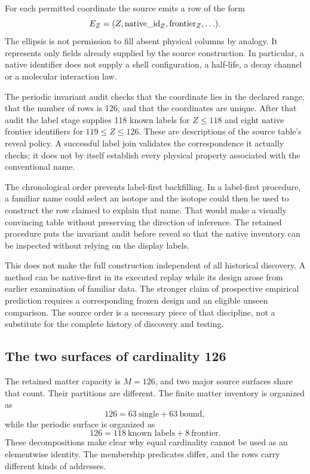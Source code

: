 For each permitted coordinate the source emits a row of the form
\begin{equation}
E_Z=(Z,{\rm native\_id}_Z,{\rm frontier}_Z,\ldots).
\end{equation}
The ellipsis is not permission to fill absent physical columns by analogy. It represents only fields already supplied by the source construction. In particular, a native identifier does not supply a shell configuration, a half-life, a decay channel or a molecular interaction law.

The periodic invariant audit checks that the coordinate lies in the declared range, that the number of rows is 126, and that the coordinates are unique. After that audit the label stage supplies 118 known labels for $Z\le118$ and eight native frontier identifiers for $119\le Z\le126$. These are descriptions of the source table's reveal policy. A successful label join validates the correspondence it actually checks; it does not by itself establish every physical property associated with the conventional name.

The chronological order prevents label-first backfilling. In a label-first procedure, a familiar name could select an isotope and the isotope could then be used to construct the row claimed to explain that name. That would make a visually convincing table without preserving the direction of inference. The retained procedure puts the invariant audit before reveal so that the native inventory can be inspected without relying on the display labels.

This does not make the full construction independent of all historical discovery. A method can be native-first in its executed replay while its design arose from earlier examination of familiar data. The stronger claim of prospective empirical prediction requires a corresponding frozen design and an eligible unseen comparison. The source order is a necessary piece of that discipline, not a substitute for the complete history of discovery and testing.

\subsection{The two surfaces of cardinality 126}

The retained matter capacity is $M=126$, and two major source surfaces share that count. Their partitions are different. The finite matter inventory is organized as
\begin{equation}
126=63\ \text{single}+63\ \text{bound},
\end{equation}
while the periodic surface is organized as
\begin{equation}
126=118\ \text{known labels}+8\ \text{frontier}.
\end{equation}
These decompositions make clear why equal cardinality cannot be used as an elementwise identity. The membership predicates differ, and the rows carry different kinds of addresses.

